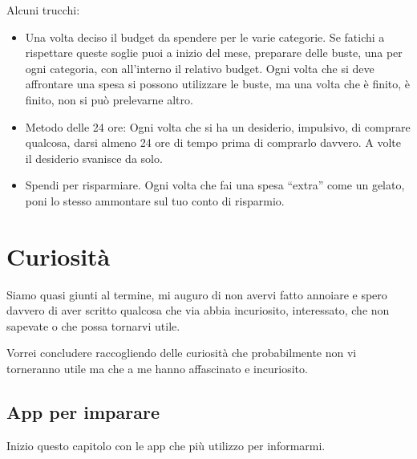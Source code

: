 \documentclass[12pt]{book} %
\begin{document}
\bigskip

Alcuni trucchi:

\begin{itemize}
\item Una volta deciso il budget da spendere per le varie categorie. Se fatichi a rispettare queste soglie puoi a inizio
del mese, preparare delle buste, una per ogni categoria, con all'interno il relativo budget. Ogni
volta che si deve affrontare una spesa si possono utilizzare le buste, ma una volta che è finito, è finito, non si può
prelevarne altro.
\item Metodo delle 24 ore: Ogni volta che si ha un desiderio, impulsivo, di comprare qualcosa, darsi almeno 24 ore di
tempo prima di comprarlo davvero. A volte il desiderio svanisce da solo.
\item Spendi per risparmiare. Ogni volta che fai una spesa “extra” come un gelato, poni lo stesso ammontare sul tuo
conto di risparmio.
\end{itemize}

\bigskip

\clearpage\section{Curiosità}
Siamo quasi giunti al termine, mi auguro di non avervi fatto annoiare e spero davvero di aver scritto qualcosa che via
abbia incuriosito, interessato, che non sapevate o che possa tornarvi utile.

Vorrei concludere raccogliendo delle curiosità che probabilmente non vi torneranno utile ma che a me hanno affascinato e
incuriosito.

\subsection{App per imparare}
Inizio questo capitolo con le app che più utilizzo per informarmi.
\end{document}
